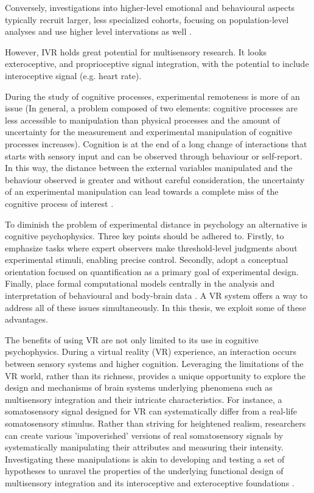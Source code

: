 \documentclass[12pt,oneside,openright]{report}
\begin{document}
Conversely, investigations into higher-level emotional and behavioural aspects typically recruit larger, less specialized cohorts, focusing on population-level analyses and use higher level intervations as well \parencite{WASKOM2019100}.

However, IVR holds great potential for multisensory research. It looks exteroceptive, and proprioceptive signal integration, with the potential to include interoceptive signal (e.g. heart rate). 

During the study of cognitive processes, experimental remoteness is more of an issue (In general, a problem composed of two elements: cognitive processes are less accessible to manipulation than physical processes and the amount of uncertainty for the measurement and experimental manipulation of cognitive processes increases). Cognition is at the end of a long change of interactions that starts with sensory input and can be observed through behaviour or self-report. In this way, the distance between the external variables manipulated and the behaviour observed is greater and without careful consideration, the uncertainty of an experimental manipulation can lead towards a complete miss of the cognitive process of interest \parencite{WASKOM2019100}.

To diminish the problem of experimental distance in psychology an alternative is cognitive psychophysics. Three key points should be adhered to. Firstly, to emphasize tasks where expert observers make threshold-level judgments about experimental stimuli, enabling precise control. Secondly, adopt a conceptual orientation focused on quantification as a primary goal of experimental design. Finally, place formal computational models centrally in the analysis and interpretation of behavioural and body-brain data \parencite{WASKOM2019100}. A VR system offers a way to address all of these issues simultaneously. In this thesis, we exploit some of these advantages. 

The benefits of using VR are not only limited to its use in cognitive psychophysics. During a virtual reality (VR) experience, an interaction occurs between sensory systems and higher cognition. Leveraging the limitations of the VR world, rather than its richness, provides a unique opportunity to explore the design and mechanisms of brain systems underlying phenomena such as multisensory integration and their intricate characteristics. For instance, a somatosensory signal designed for VR can systematically differ from a real-life somatosensory stimulus. Rather than striving for heightened realism, researchers can create various 'impoverished' versions of real somatosensory signals by systematically manipulating their attributes and measuring their intensity. Investigating these manipulations is akin to developing and testing a set of hypotheses to unravel the properties of the underlying functional design of multisensory integration and its interoceptive and exteroceptive foundations \parencite{deGelder2018VirtualRA}.
\end{document}
